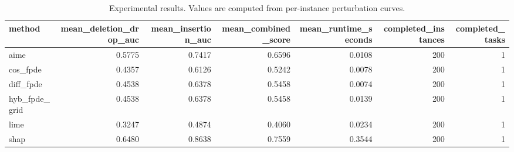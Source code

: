 \begin{table}[t]
\caption{Experimental results. Values are computed from per-instance perturbation curves.}
\label{tab:main_results_computed}
\centering
\begin{tabular}{lrrrrrr}
\toprule
method & mean\_deletion\_drop\_auc & mean\_insertion\_auc & mean\_combined\_score & mean\_runtime\_seconds & completed\_instances & completed\_tasks \\
\midrule
aime & 0.5775 & 0.7417 & 0.6596 & 0.0108 & 200 & 1 \\
cos\_fpde & 0.4357 & 0.6126 & 0.5242 & 0.0078 & 200 & 1 \\
diff\_fpde & 0.4538 & 0.6378 & 0.5458 & 0.0074 & 200 & 1 \\
hyb\_fpde\_grid & 0.4538 & 0.6378 & 0.5458 & 0.0139 & 200 & 1 \\
lime & 0.3247 & 0.4874 & 0.4060 & 0.0234 & 200 & 1 \\
shap & 0.6480 & 0.8638 & 0.7559 & 0.3544 & 200 & 1 \\
\bottomrule
\end{tabular}

\end{table}
